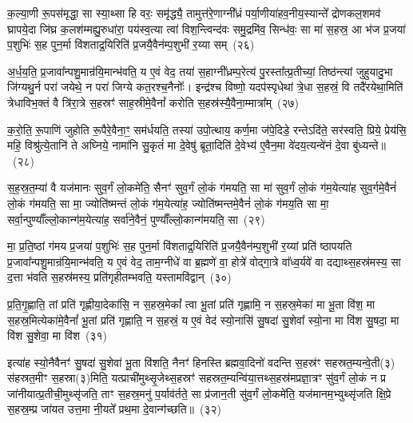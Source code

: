 क॒ल्या॒णी रू॒पस॑मृद्धा॒ सा स्या॒थ्सा हि वरः॒ समृ॑द्ध्यै॒ तामुत्त॑रे॒णाग्नी᳚ध्रं पर्या॒णीया॑हव॒नीय॒स्यान्ते᳚ द्रोणकल॒शमव॑ घ्रापये॒दा जि॑घ्र क॒लश॑म्मह्यु॒रुधा॑रा॒ पय॑स्व॒त्या त्वा॑ विश॒न्त्विन्द॑वः समु॒द्रमि॑व॒ सिन्ध॑वः॒ सा मा॑ स॒हस्र॒ आ भ॑ज प्र॒जया॑ प॒शुभिः॑ स॒ह पुन॒र्मा वि॑शताद्र॒यिरिति॑ प्र॒जयै॒वैन॑म्प॒शुभी॑ र॒य्या सम्~(२६)

अ॒र्ध॒य॒ति॒ प्र॒जावा᳚न्पशु॒मान्र॑यि॒मान्भ॑वति॒ य ए॒वं वेद॒ तया॑ स॒हाग्नी᳚ध्रम्प॒रेत्य॑ पु॒रस्ता᳚त्प्र॒तीच्यां॒ तिष्ठ॑न्त्यां जुहुयादु॒भा जि॑ग्यथु॒र्न परा॑ जयेथे॒ न परा॑ जिग्ये कत॒रश्च॒नैनोः᳚। इन्द्र॑श्च विष्णो॒ यदप॑स्पृधेथां त्रे॒धा स॒हस्रं॒ वि तदै॑रयेथा॒मिति॑ त्रेधाविभ॒क्तं वै त्रि॑रा॒त्रे स॒हस्रꣳ॑ साह॒स्रीमे॒वैनां᳚ करोति स॒हस्र॑स्यै॒वैना॒म्मात्रा᳚म्~(२७)

क॒रो॒ति॒ रू॒पाणि॑ जुहोति रू॒पैरे॒वैना॒ꣳ॒ सम॑र्धयति॒ तस्या॑ उपो॒त्थाय॒ कर्ण॒मा ज॑पे॒दिडे॒ रन्ते\-ऽदि॑ते॒ सर॑स्वति॒ प्रिये॒ प्रेय॑सि॒ महि॒ विश्रु॑त्ये॒तानि॑ ते अघ्निये॒ नामा॑नि सु॒कृतं॑ मा दे॒वेषु॑ ब्रूता॒दिति॑ दे॒वेभ्य॑ ए॒वैन॒मा वे॑दय॒त्यन्वे॑नं दे॒वा बु॑ध्यन्ते॥~(२८)

{\anuvakamend[{ए॒तदे॒तस्यां᳚ वी॒र्य॑मस्य त्रि॒भिश्च॑ द॒त्ता स॑हस्रत॒मी तस्मा॑दे॒व वरः॒ सम्मात्रा॒मेका॒न्नच॑त्वारि॒ꣳ॒शच्च॑}]}%

स॒ह॒स्र॒त॒म्या॑ वै यज॑मानः सुव॒र्गं लो॒कमे॑ति॒ सैनꣳ॑ सुव॒र्गं लो॒कं ग॑मयति॒ सा मा॑ सुव॒र्गं लो॒कं ग॑म॒येत्या॑ह सुव॒र्गमे॒वैनं॑ लो॒कं ग॑मयति॒ सा मा॒ ज्योति॑ष्मन्तं लो॒कं ग॑म॒येत्या॑ह॒ ज्योति॑ष्मन्तमे॒वैनं॑ लो॒कं ग॑मय॒ति सा मा॒ सर्वा॒न्पुण्याँ᳚ल्लो॒कान्ग॑म॒येत्या॑ह॒ सर्वा॑ने॒वैनं॒ पुण्याँ᳚ल्लो॒कान्ग॑मयति॒ सा~(२९)

मा॒ प्र॒ति॒ष्ठां ग॑मय प्र॒जया॑ प॒शुभिः॑ स॒ह पुन॒र्मा वि॑शताद्र॒यिरिति॑ प्र॒जयै॒वैन॑म्प॒शुभी॑ र॒य्यां प्रति॑ ष्ठापयति प्र॒जावा᳚न्पशु॒मान्र॑यि॒मान्भ॑वति॒ य ए॒वं वेद॒ ताम॒ग्नीधे॑ वा ब्र॒ह्मणे॑ वा॒ होत्रे॑ वोद्गा॒त्रे वा᳚ध्व॒र्यवे॑ वा दद्याथ्स॒हस्र॑मस्य॒ सा द॒त्ता भ॑वति स॒हस्र॑मस्य॒ प्रति॑गृहीतम्भवति॒ यस्तामवि॑द्वान्~(३०)

प्र॒ति॒गृ॒ह्णाति॒ तां प्रति॑ गृह्णीया॒देका॑सि॒ न स॒हस्र॒मेकां᳚ त्वा भू॒तां प्रति॑ गृह्णामि॒ न स॒हस्र॒मेका॑ मा भू॒ता वि॑श॒ मा स॒हस्र॒मित्येका॑मे॒वैनां᳚ भू॒तां प्रति॑ गृह्णाति॒ न स॒हस्रं॒ य ए॒वं वेद॑ स्यो॒नासि॑ सु॒षदा॑ सु॒शेवा᳚ स्यो॒ना मा वि॑श सु॒षदा॒ मा वि॑श सु॒शेवा॒ मा वि॑श~(३१)

इत्या॑ह स्यो॒नैवैनꣳ॑ सु॒षदा॑ सु॒शेवा॑ भू॒ता वि॑शति॒ नैनꣳ॑ हिनस्ति ब्रह्मवा॒दिनो॑ वदन्ति स॒हस्र॑ꣳ सहस्रत॒म्यन्वे॒ती(३) स॑हस्रत॒मीꣳ स॒हस्रा(३)मिति॒ यत्प्राची॑मुथ्सृ॒जेथ्स॒हस्रꣳ॑ सहस्रत॒म्यन्वि॑या॒त्तथ्स॒हस्र॑मप्रज्ञा॒त्रꣳ सु॑व॒र्गं लो॒कं न प्र जा॑नीयात्प्र॒तीची॒मुथ्सृ॑जति॒ ताꣳ स॒हस्र॒मनु॑ प॒र्याव॑र्तते॒ सा प्र॑जान॒ती सु॑व॒र्गं लो॒कमे॑ति॒ यज॑मानम॒भ्युथ्सृ॑जति क्षि॒प्रे स॒हस्र॒म्प्र जा॑यत उत्त॒मा नी॒यते᳚ प्रथ॒मा दे॒वान्ग॑च्छति॥~(३२)

